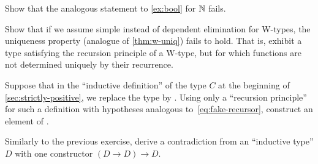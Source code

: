 \begin{ex}
  Show that the analogous statement to \autoref{ex:bool} for $\mathbb{N}$ fails.
\end{ex}

\begin{ex}
  Show that if we assume simple instead of dependent elimination for W-types, the uniqueness property (analogue of \autoref{thm:w-uniq}) fails to hold.
  That is, exhibit a type satisfying the recursion principle of a W-type, but for which functions are not determined uniquely by their recurrence.
\end{ex}

\begin{ex}\label{ex:loop}
  Suppose that in the ``inductive definition'' of the type $C$ at the beginning of \autoref{sec:strictly-positive}, we replace the type \nat by \emptyt.
  Using only a ``recursion principle'' for such a definition with hypotheses analogous to~\eqref{eq:fake-recursor}, construct an element of \emptyt.
\end{ex}

\begin{ex}\label{ex:loop2}
  Similarly to the previous exercise, derive a contradiction from an ``inductive type'' $D$ with one constructor $(D\to D) \to D$.
\end{ex}


